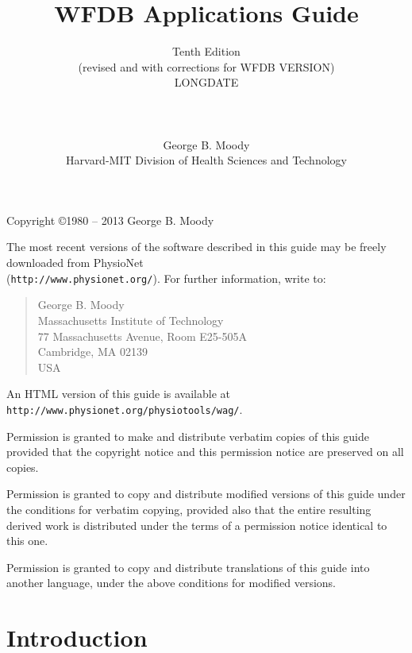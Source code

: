 \documentclass[twoside]{book}
\title{WFDB Applications Guide}
\author{Tenth Edition\\
(revised and with corrections for WFDB VERSION)\\
LONGDATE\\
\\
\\
\\
George B. Moody\\
Harvard-MIT Division of Health Sciences and Technology}
\date{}
\begin{document}
\maketitle

\pagestyle{empty}
\vspace*{\fill}
\noindent
Copyright \copyright 1980 -- 2013 George B. Moody

\vspace{1 in}
\noindent
The most recent versions of the software described in this guide may be
freely downloaded from PhysioNet\\
({\tt http://www.physionet.org/}).
For further information, write to:

\begin{quote}
George B. Moody\\
Massachusetts Institute of Technology\\
77 Massachusetts Avenue, Room E25-505A\\
Cambridge, MA 02139\\
USA\\
\end{quote}

\noindent
An HTML version of this guide is available at
{\tt http://www.\-physio\-net.\-org/\-physio\-tools/\-wag/}.

\vspace{0.2 in}
\noindent
Permission is granted to make and distribute verbatim copies of this
guide provided that the copyright notice and this permission notice are
preserved on all copies.

\vspace{0.2 in}
\noindent
Permission is granted to copy and distribute modified versions of this
guide under the conditions for verbatim copying, provided also that the
entire resulting derived work is distributed under the terms of a
permission notice identical to this one.

\vspace{0.2 in}
\noindent
Permission is granted to copy and distribute translations of this guide
into another language, under the above conditions for modified versions.

\newpage
\pagestyle{fancyplain}

\tableofcontents

\newpage
{}


\chapter*{Introduction}
\end{document}
